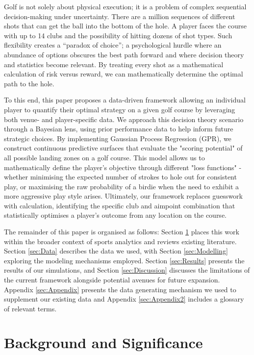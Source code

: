 \documentclass[11pt, letterpaper]{article}
\begin{document}
Golf is not solely about physical execution; it is a problem of complex sequential decision-making under uncertainty. There are a million sequences of different shots that can get the ball into the bottom of the hole. A player faces the course with up to 14 clubs and the possibility of hitting dozens of shot types. Such flexibility creates a ``paradox of choice''; a psychological hurdle where an abundance of options obscures the best path forward \parencite{schwartz2015paradox} and where decision theory and statistics become relevant. By treating every shot as a mathematical calculation of risk versus reward, we can mathematically determine the optimal path to the hole. 

To this end, this paper proposes a data-driven framework allowing an individual player to quantify their optimal strategy on a given golf course by leveraging both venue- and player-specific data. We 
approach this decision theory scenario through a Bayesian lens, using prior performance data to help inform future strategic choices. By implementing Gaussian Process Regression (GPR), we construct continuous predictive surfaces that evaluate the "scoring potential" of all possible landing zones on a golf course. This model allows us to mathematically define the player's objective through different "loss functions" - whether minimising the expected number of strokes to hole out for consistent play, or maximising the raw probability of a birdie when the need to exhibit a more aggressive play style arises. Ultimately, our framework replaces guesswork with calculation, identifying the specific club and aimpoint combination that statistically optimises a player's outcome from any location on the course.

The remainder of this paper is organised as follows: Section \ref{sec:Background} places this work within the broader context of sports analytics and reviews existing literature. Section \ref{sec:Data} describes the data we used, with Section \ref{sec:Modelling} exploring the modeling mechanisms employed. Section \ref{sec:Results} presents the results of our simulations, and Section \ref{sec:Discussion} discusses the limitations of the current framework alongside potential avenues for future expansion.  Appendix \ref{sec:Appendix} presents the data generating mechanism we used to supplement our existing data and Appendix \ref{sec:Appendix2} includes a glossary of relevant terms.

\section{Background and Significance}
\label{sec:Background}
\end{document}
